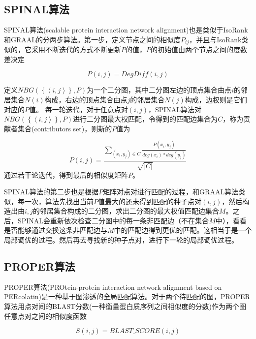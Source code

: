 \subsection{SPINAL算法}
SPINAL算法(scalable protein interaction network alignment)也是类似于IsoRank和GRAAL的分两步算法。第一步，定义节点之间的相似度$P_{ij}$，并且与IsoRank类似的，它采用不断迭代的方式不断更新$P$的值，$P$的初始值由两个节点之间的度数差决定

\begin{equation}\label{spinal1}
P(i,j)=DegDiff(i,j)
\end{equation}

定义$NBG(\left \{ \left \langle i,j \right \rangle \right \},P)$为一个二分图，其中二分图左边的顶点集合由点$i$的邻居集合$N(i)$构成，右边的顶点集合由点$j$的邻居集合$N(j)$构成，边权则是它们对应的$P$值。
每一轮迭代，对于任意点对$(i,j)$，SPINAL算法对$NBG(\left \{ \left \langle i,j \right \rangle \right \},P)$进行二分图最大权匹配，令得到的匹配边集合为$C$，称为贡献者集合(contributors set)，则新的$P$值为

\begin{equation}\label{spinal2}
P(i,j)=\frac{\sum_{(x_i,y_j)\in C}\frac{P(x_i,y_j)}{deg(x_i)*deg(y_j)}}{\sqrt{\left | C \right |}}
\end{equation}
通过若干论迭代，得到最后的相似度矩阵$P$。

SPINAL算法的第二步也是根据$P$矩阵对点对进行匹配的过程，和GRAAL算法类似，每一次，算法先找出当前$P$值最大的还未得到匹配的种子点对$(i,j)$，然后构造出由$i,j$的邻居集合构成的二分图，求出二分图的最大权值匹配边集合$M$。之后，SPINAL会重新依次检查二分图中的每一条非匹配边（不在集合$M$中），看看是否能够通过交换这条非匹配边与$M$中的匹配边得到更优的匹配。这相当于是一个局部调优的过程。然后再去寻找新的种子点对，进行下一轮的局部调优过程。
\subsection{PROPER算法}
PROPER算法(PROtein-protein interaction network alignment based on PERcolatin)\cite{kazemi2016proper}是一种基于图渗透的全局匹配算法。对于两个待匹配的图，PROPER算法用点对间的BLAST分数\cite{altschul1990basic}(一种衡量蛋白质序列之间相似度的分数)作为两个图任意点对之间的相似度函数

\begin{equation}\label{proper1}
S(i,j)=BLAST\_SCORE(i,j)
\end{equation}


